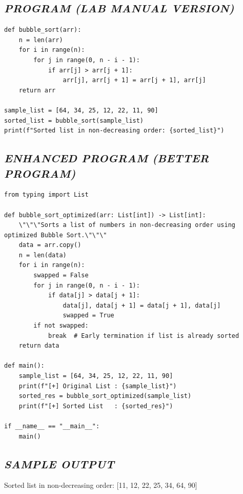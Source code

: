 \documentclass[11pt,a4paper]{article}
\begin{document}
\subsection*{\textit{PROGRAM (LAB MANUAL VERSION)}}
\begin{lstlisting}[style=pythonstyle]
def bubble_sort(arr): 
    n = len(arr) 
    for i in range(n): 
        for j in range(0, n - i - 1): 
            if arr[j] > arr[j + 1]: 
                arr[j], arr[j + 1] = arr[j + 1], arr[j] 
    return arr 
 
sample_list = [64, 34, 25, 12, 22, 11, 90] 
sorted_list = bubble_sort(sample_list) 
print(f"Sorted list in non-decreasing order: {sorted_list}")
\end{lstlisting}

\subsection*{\textit{ENHANCED PROGRAM (BETTER PROGRAM)}}
\begin{lstlisting}[style=pythonstyle]
from typing import List

def bubble_sort_optimized(arr: List[int]) -> List[int]:
    \"\"\"Sorts a list of numbers in non-decreasing order using optimized Bubble Sort.\"\"\"
    data = arr.copy()
    n = len(data)
    for i in range(n):
        swapped = False
        for j in range(0, n - i - 1):
            if data[j] > data[j + 1]:
                data[j], data[j + 1] = data[j + 1], data[j]
                swapped = True
        if not swapped:
            break  # Early termination if list is already sorted
    return data

def main():
    sample_list = [64, 34, 25, 12, 22, 11, 90]
    print(f"[+] Original List : {sample_list}")
    sorted_res = bubble_sort_optimized(sample_list)
    print(f"[+] Sorted List   : {sorted_res}")

if __name__ == "__main__":
    main()
\end{lstlisting}

\subsection*{\textit{SAMPLE OUTPUT}}
\begin{tcolorbox}[colback=black!85,colframe=navyblue,title=\textbf{Terminal Output},coltitle=white,fonttitle=\bfseries\small]
\small\ttfamily\color{green!30!white}
Sorted list in non-decreasing order: [11, 12, 22, 25, 34, 64, 90]
\end{tcolorbox}
\end{document}
